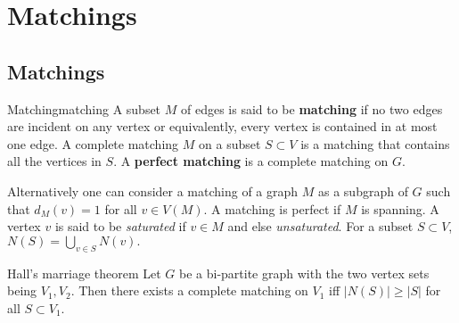 \documentclass[../basic_graph_theory.tex]{subfiles}
\begin{document}
\chapter{Matchings}
\setcounter{chapter}{5} %
\setcounter{section}{0}
\setcounter{equation}{0}
\setcounter{figure}{0}

\section{Matchings}

\begin{Def}{Matching}{matching} 
    A subset $M$ of edges is said to be \textbf{matching} if no two edges are incident on any vertex or equivalently, every vertex is contained in at most one edge. A {complete matching} $M$ on a subset $S \subset V$ is a matching that contains all the vertices in $S$. A \textbf{perfect matching} is a complete matching on $G$.
\end{Def}

Alternatively one can consider a matching of a graph $M$ as a subgraph of $G$ such that $d_M(v) = 1$ for all $v \in V(M)$. A matching is perfect if $M$ is spanning. A vertex $v$ is said to be {\em saturated} if $v \in M$ and else {\em unsaturated}. For a subset $S \subset V$, $N(S) = \bigcup_{v \in S}N(v).$

\begin{Thm}{Hall's marriage theorem}{} 
    Let $G$ be a bi-partite graph with the two vertex sets being $V_1,V_2$.  Then there exists a complete matching on $V_1$ iff $|N(S)| \geq |S|$ for all $S \subset V_1$.
\end{Thm}
\end{document}
